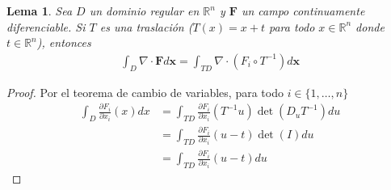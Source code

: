 \documentclass{report}
\newcommand{\realNumbers}{\mathbb{R}}
\newtheorem{lemma}{Lema}
\theoremstyle{definition}
\theoremstyle{remark}
\begin{document}
  \begin{lemma}
    Sea \(D\) un dominio regular en \(\realNumbers^n\) y \(\mathbf{F}\)  un campo continuamente diferenciable.
    Si \(T\) es una traslación (\(T(x) = x + t\) para todo \(x \in \realNumbers^n\) donde \(t \in \realNumbers^n\)), entonces
    \begin{align}
      \int_D
        \nabla \cdot \mathbf{F}
      d \mathbf{x}
      =
      \int_{T D}
        \nabla \cdot (F_i \circ T^{- 1})
      d \mathbf{x}
    \end{align}
  \end{lemma}
  \begin{proof}
    Por el teorema de cambio de variables, para todo \(i \in \{1, \dots, n\}\)
    \begin{align}
      \int_D \frac{\partial F_i}{\partial x_i}(x) dx
      &=
      \int_{T D}
        \frac{\partial F_i}{\partial x_i}(T^{- 1} u)
        \det\left(D_u T^{-1}\right)
      du
      \\
      &=
      \int_{T D}
        \frac{\partial F_i}{\partial x_i}(u - t)
        \det(I)
      du
      \\
      &=
      \int_{T D}
        \frac{\partial F_i}{\partial x_i}(u - t)
      du
    \end{align}
  \end{proof}
\end{document}

